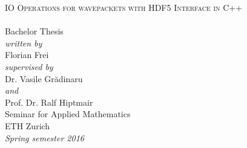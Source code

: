 \begin{titlepage}
\begin{center}
  \hfill
  \vspace{3.0cm}

  {\huge \textsc{IO Operations for wavepackets with HDF5 Interface in C++\\[10pt]
  }}
  ~\\[20pt]

  {\huge{Bachelor Thesis}}\\[2.5cm]

  {\emph{written by}}\\
  Florian Frei
  \\[0.6cm]
  {\emph{supervised by}}\\
  Dr. Vasile Gr\u{a}dinaru\\
  {\emph{and}}\\
  Prof. Dr. Ralf Hiptmair
  \\[2.5cm]

  Seminar for Applied Mathematics\\
  ETH Zurich
  \\[0.5cm]
  \emph{{Spring semester 2016}}
\end{center}
\end{titlepage}

